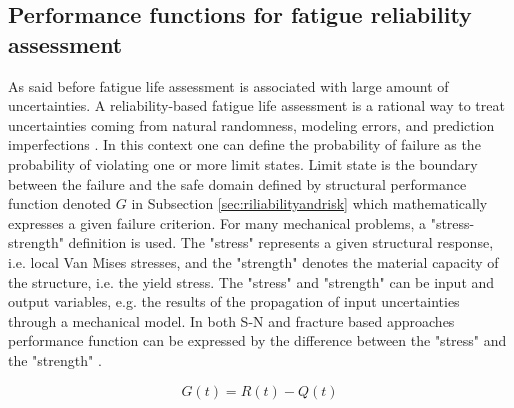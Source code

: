 \subsection{Performance functions for fatigue reliability assessment}
\label{subsec:fatigueperformance}
\noindent
As said before fatigue life assessment is associated with large amount of uncertainties. A reliability-based fatigue life assessment is a rational way to treat uncertainties coming from 
natural randomness, modeling errors, and prediction imperfections \citep{Byers1997}. In this context one can define the probability of failure as the probability of violating one or more limit states. 
Limit state is the boundary between the failure and the safe domain defined by structural performance function denoted $G$ in Subsection \ref{sec:riliabilityandrisk} which mathematically expresses a 
given failure criterion. For many mechanical problems, a "stress-strength" definition is used. The "stress" represents a given structural response, i.e. local Van Mises stresses, and the "strength" 
denotes the material capacity of the structure, i.e. the yield stress. The "stress" and "strength" can be input and output variables, e.g. the results of the propagation of input uncertainties 
through a mechanical model. In both S-N and fracture based approaches performance function can be expressed by the difference between the "stress" and the "strength" \citep{BARONE201421}. 

\begin{equation}
 G(t) = R(t) - Q(t)
 \label{eq:S-Nlimit}
\end{equation}

